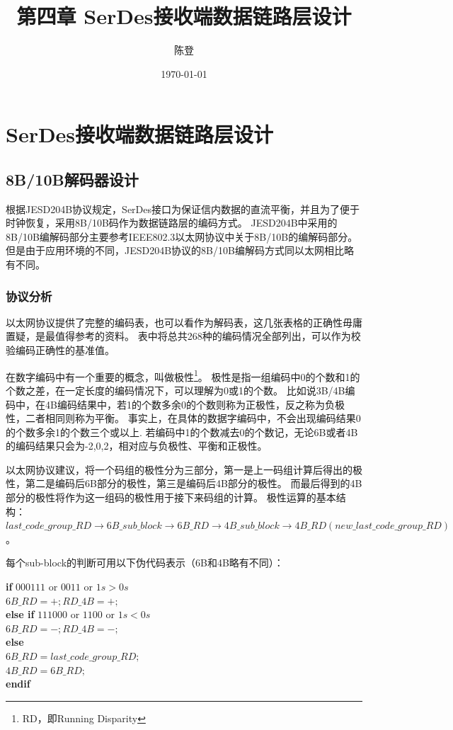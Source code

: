 \documentclass[UTF8]{ctexart}
\title{第四章 SerDes接收端数据链路层设计}
\author{陈登}
\date{\today}
\newcommand\kw{\textbf}
\begin{document}
\section{SerDes接收端数据链路层设计}

\subsection{8B/10B解码器设计}

根据JESD204B协议规定，SerDes接口为保证信内数据的直流平衡，并且为了便于时钟恢复，采用8B/10B码作为数据链路层的编码方式。
JESD204B中采用的8B/10B编解码部分主要参考IEEE802.3以太网协议中关于8B/10B的编解码部分。
但是由于应用环境的不同，JESD204B协议的8B/10B编解码方式同以太网相比略有不同。

\subsubsection{协议分析}

以太网协议提供了完整的编码表，也可以看作为解码表，这几张表格的正确性毋庸置疑，是最值得参考的资料。
表中将总共268种的编码情况全部列出，可以作为校验编码正确性的基准值。

在数字编码中有一个重要的概念，叫做极性\footnote{RD，即Running Disparity}。
极性是指一组编码中0的个数和1的个数之差，在一定长度的编码情况下，可以理解为0或1的个数。
比如说3B/4B编码中，在4B编码结果中，若1的个数多余0的个数则称为正极性，反之称为负极性，二者相同则称为平衡。
事实上，在具体的数据字编码中，不会出现编码结果0的个数多余1的个数三个或以上.
若编码中1的个数减去0的个数记，无论6B或者4B的编码结果只会为-2,0,2，相对应与负极性、平衡和正极性。

以太网协议建议，将一个码组的极性分为三部分，第一是上一码组计算后得出的极性，第二是编码后6B部分的极性，第三是编码后4B部分的极性。
而最后得到的4B部分的极性将作为这一组码的极性用于接下来码组的计算。
极性运算的基本结构：$last\_code\_group\_RD \to 6B\_sub\_block \to 6B\_RD \to 4B\_sub\_block \to 4B\_RD(new\_last\_code\_group\_RD)$。

每个sub-block的判断可用以下伪代码表示（6B和4B略有不同）：

\begin{tabbing}
\qquad\=\kw{if} $000111$ or $0011$ or $1s>0s$ \\
      \>\qquad$6B\_RD=+;RD\_4B=+;$ \\
      \>\kw{else if} $111000$ or $1100$ or $1s<0s$ \\
      \>\qquad$6B\_RD=-;RD\_4B=-;$ \\
      \>\kw{else} \\
      \>\qquad$6B\_RD=last\_code\_group\_RD;$ \\
      \>\qquad$4B\_RD=6B\_RD;$ \\
      \>\kw{endif}
\end{tabbing}
\end{document}
